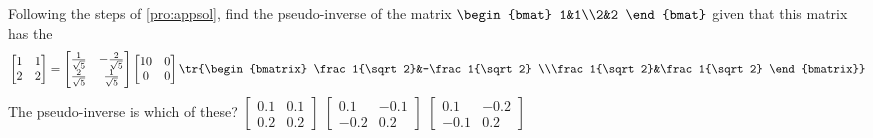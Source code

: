 \begin{activity}
Following the steps of \cref{pro:appsol}, find the pseudo-inverse of the matrix \(\begin{bmat} 1&1\\2&2 \end{bmat}\) given that this matrix has the \svd
\begin{equation*}
\begin{bmatrix} 1&1\\2&2 \end{bmatrix}
=\begin{bmatrix} \frac1{\sqrt5}&-\frac2{\sqrt5}
\\\frac2{\sqrt5}&\frac1{\sqrt5} \end{bmatrix}
\begin{bmatrix} 10&0\\0&0 \end{bmatrix}
\tr{\begin{bmatrix} \frac1{\sqrt2}&-\frac1{\sqrt2}
\\\frac1{\sqrt2}&\frac1{\sqrt2} \end{bmatrix}}
\end{equation*}
The pseudo-inverse is which of these?
{\(\begin{bmatrix} 0.1&0.1\\0.2&0.2 \end{bmatrix}\)}
{\(\begin{bmatrix} 0.1&-0.1\\-0.2&0.2 \end{bmatrix}\)}
{\(\begin{bmatrix} 0.1&-0.2\\-0.1&0.2 \end{bmatrix}\)}
\end{activity}






